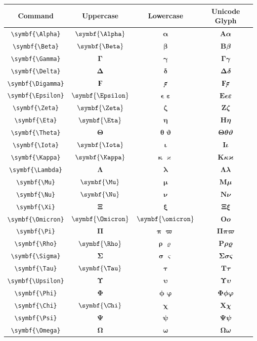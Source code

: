 \documentclass[12pt,a4paper]{article}
\begin{document}
\begin{longtable}{|c|c|c|c|}
\hline
\textbf{Command} & \textbf{Uppercase} & \textbf{Lowercase} & \textbf{Unicode Glyph} \\
\hline
\verb|\symbf{\Alpha}| & $\symbf{\Alpha}$ & $\symbf{\alpha}$ & $ 𝚨 𝜶 $ \\
\verb|\symbf{\Beta}| & $\symbf{\Beta}$ & $\symbf{\beta}$ & $ 𝚩 𝜷 $ \\
\verb|\symbf{\Gamma}| & $\symbf{\Gamma}$ & $\symbf{\gamma}$ & $ 𝚪 𝜸 $ \\
\verb|\symbf{\Delta}| & $\symbf{\Delta}$ & $\symbf{\delta}$ & $ 𝚫 𝜹 $ \\
\verb|\symbf{\Digamma}| & $\symbf{\Digamma}$ & $\symbf{\digamma}$ & $ 𝟊 𝟋 $ \\
\verb|\symbf{\Epsilon}| & $\symbf{\Epsilon}$ & $\symbf{\epsilon}$ $\symbf{\varepsilon}$ & $ 𝚬 𝝐 𝜺 $ \\
\verb|\symbf{\Zeta}| & $\symbf{\Zeta}$ & $\symbf{\zeta}$ & $ 𝚭 𝜻 $ \\
\verb|\symbf{\Eta}| & $\symbf{\Eta}$ & $\symbf{\eta}$ & $ 𝚮 𝜼 $ \\
\verb|\symbf{\Theta}| & $\symbf{\Theta}$ & $\symbf{\theta}$ $\symbf{\vartheta}$ & $ 𝚯 𝜽 𝝑 $ \\
\verb|\symbf{\Iota}| & $\symbf{\Iota}$ & $\symbf{\iota}$ & $ 𝚰 𝜾 $ \\
\verb|\symbf{\Kappa}| & $\symbf{\Kappa}$ & $\symbf{\kappa}$ $\symbf{\varkappa}$ & $ 𝚱 𝜿 𝝒 $ \\
\verb|\symbf{\Lambda}| & $\symbf{\Lambda}$ & $\symbf{\lambda}$ & $ 𝚲 𝝀 $ \\
\verb|\symbf{\Mu}| & $\symbf{\Mu}$ & $\symbf{\mu}$ & $ 𝚳 𝝁 $ \\
\verb|\symbf{\Nu}| & $\symbf{\Nu}$ & $\symbf{\nu}$ & $ 𝚴 𝝂 $ \\
\verb|\symbf{\Xi}| & $\symbf{\Xi}$ & $\symbf{\xi}$ & $ 𝚵 𝝃 $ \\
\verb|\symbf{\Omicron}| & $\symbf{\Omicron}$ & $\symbf{\omicron}$ & $ 𝚶 𝝄 $ \\
\verb|\symbf{\Pi}| & $\symbf{\Pi}$ & $\symbf{\pi}$ $\symbf{\varpi}$ & $ 𝚷 𝝅 𝝕 $ \\
\verb|\symbf{\Rho}| & $\symbf{\Rho}$ & $\symbf{\rho}$ $\symbf{\varrho}$ & $ 𝚸 𝝆 𝝔 $ \\
\verb|\symbf{\Sigma}| & $\symbf{\Sigma}$ & $\symbf{\sigma}$ $\symbf{\varsigma}$ & $ 𝚺 𝝈 𝝇 $ \\
\verb|\symbf{\Tau}| & $\symbf{\Tau}$ & $\symbf{\tau}$ & $ 𝚻 𝝉 $ \\
\verb|\symbf{\Upsilon}| & $\symbf{\Upsilon}$ & $\symbf{\upsilon}$ & $ 𝚼 𝝊 $ \\
\verb|\symbf{\Phi}| & $\symbf{\Phi}$ & $\symbf{\phi}$ $\symbf{\varphi}$ & $ 𝚽 𝝓 𝝋 $ \\
\verb|\symbf{\Chi}| & $\symbf{\Chi}$ & $\symbf{\chi}$ & $ 𝚾 𝝌 $ \\
\verb|\symbf{\Psi}| & $\symbf{\Psi}$ & $\symbf{\psi}$ & $ 𝚿 𝝍 $ \\
\verb|\symbf{\Omega}| & $\symbf{\Omega}$ & $\symbf{\omega}$ & $ 𝛀 𝝎 $ \\
\hline
\end{longtable}
\end{document}
